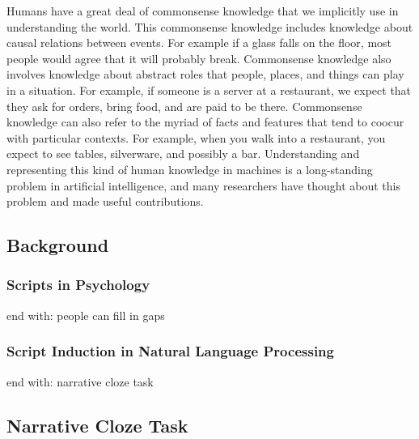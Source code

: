 \documentclass[10pt,a4paper]{article}
\newcommand{\todo}[1]{{\color{red}#1}}
\begin{document}
Humans have a great deal of commonsense knowledge that we implicitly use in understanding the world.
This commonsense knowledge includes knowledge about causal relations between events.
For example if a glass falls on the floor, most people would agree that it will probably break.
Commonsense knowledge also involves knowledge about abstract roles that people, places, and things can play in a situation.
For example, if someone is a server at a restaurant, we expect that they ask for orders, bring food, and are paid to be there.
Commonsense knowledge can also refer to the myriad of facts and features that tend to coocur with particular contexts.
For example, when you walk into a restaurant, you expect to see tables, silverware, and possibly a bar.
Understanding and representing this kind of human knowledge in machines is a long-standing problem in artificial intelligence, and many researchers have \todo{thought about this problem and made useful contributions.}

\subsection{Background}

\subsubsection{Scripts in Psychology}

\todo{end with: people can fill in gaps}

\subsubsection{Script Induction in Natural Language Processing}

\todo{end with: narrative cloze task}

\subsection{Narrative Cloze Task}
\end{document}
